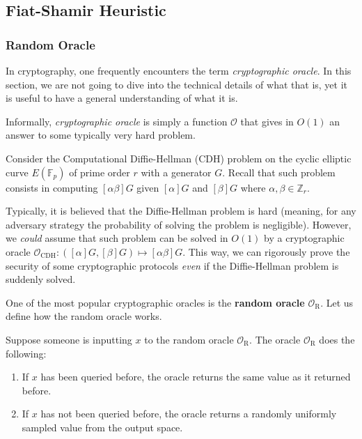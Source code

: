 \documentclass[../lecture-notes-148x210.tex]{subfiles}
\begin{document}
\subsection{Fiat-Shamir Heuristic}

\subsubsection{Random Oracle}

In cryptography, one frequently encounters the term \textit{cryptographic
oracle}. In this section, we are not going to dive into the technical details of
what that is, yet it is useful to have a general understanding of what it is.

\begin{definition}
    Informally, \textit{cryptographic oracle} is simply a function $\mathcal{O}$
    that gives in $O(1)$ an answer to some typically very hard problem.     
\end{definition}

\begin{example}
    Consider the Computational Diffie-Hellman (CDH) problem on the cyclic
    elliptic curve $E(\mathbb{F}_p)$ of prime order $r$ with a generator $G$.
    Recall that such problem consists in computing $[\alpha\beta]G$ given
    $[\alpha]G$ and $[\beta]G$ where $\alpha,\beta \in \mathbb{Z}_r$. 

    Typically, it is believed that the Diffie-Hellman problem is hard (meaning,
    for any adversary strategy the probability of solving the problem is
    negligible). However, we \textit{could} assume that such problem can be
    solved in $O(1)$ by a cryptographic oracle $\mathcal{O}_{\text{CDH}}:
    ([\alpha]G,[\beta]G) \mapsto [\alpha\beta]G$. This way, we can rigorously
    prove the security of some cryptographic protocols \textit{even} if the
    Diffie-Hellman problem is suddenly solved. 
\end{example}

One of the most popular cryptographic oracles is the \textbf{random oracle}
$\mathcal{O}_{\text{R}}$. Let us define how the random oracle works.

Suppose someone is inputting $x$ to the random oracle $\mathcal{O}_{\text{R}}$.
The oracle $\mathcal{O}_{\text{R}}$ does the following:
\begin{enumerate}
    \item If $x$ has been queried before, the oracle returns the same value as
    it returned before.
    \item If $x$ has not been queried before, the oracle returns a randomly
    uniformly sampled value from the output space.
\end{enumerate}
\end{document}

